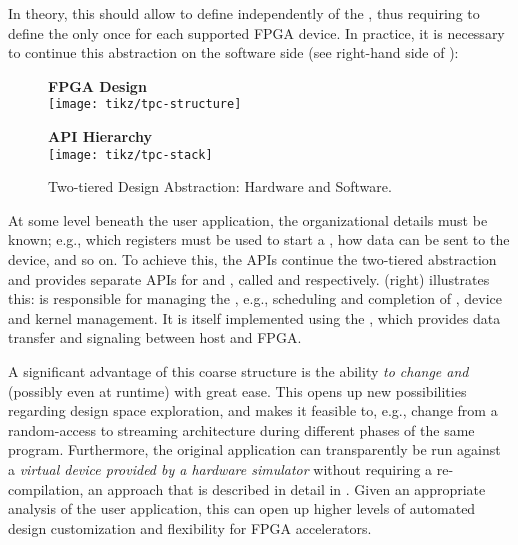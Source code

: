 In theory, this should allow to define  independently of the , thus requiring to define the  only once for each supported FPGA device.
In practice, it is necessary to continue this abstraction on the software side (see right-hand side of ):
%
\begin{figure}
  \begin{minipage}{.5\textwidth}%
  \begin{center}\textbf{FPGA Design}\\\texttt{[image: tikz/tpc-structure]}\end{center}%
  \end{minipage}%
  \begin{minipage}{.5\textwidth}%
  \begin{center}\textbf{API Hierarchy}\\\texttt{[image: tikz/tpc-stack]}\end{center}%
  \end{minipage}

  \caption{Two-tiered Design Abstraction: Hardware and Software.}
  \label{fig:two-tiered-design-abstraction}
\end{figure}
%
At some level beneath the user application, the organizational details must be known; e.g., which registers must be used to start a , how data can be sent to the device, and so on.
To achieve this, the \tpc{} APIs continue the two-tiered abstraction and provides separate APIs for  and , called  and  respectively.
 (right) illustrates this:
 is responsible for managing the , e.g., scheduling and completion of , device and kernel management.
It is itself implemented using the , which provides data transfer and signaling between host and FPGA.

\medskip
A significant advantage of this coarse structure is the ability \emph{to change  and } (possibly even at runtime) with great ease.
This opens up new possibilities regarding design space exploration, and makes it feasible to, e.g., change from a random-access to streaming architecture during different phases of the same program.
Furthermore, the original application can transparently be run against a \emph{virtual device provided by a hardware simulator} without requiring a re-compilation, an approach that is described in detail in .
Given an appropriate analysis of the user application, this can open up higher levels of automated design customization and flexibility for FPGA accelerators.

